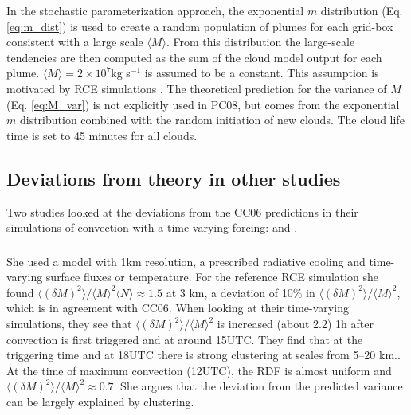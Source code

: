 \documentclass[a4paper, 12pt]{article}
\begin{document}
In the \cite[][PC08]{Plant2008} stochastic parameterization approach, the exponential $m$ distribution (Eq. \ref{eq:m_dist}) is used to create a random population of plumes for each grid-box consistent with a large scale $\langle M \rangle$. From this distribution the large-scale tendencies are then computed as the sum of the cloud model output for each plume. $\langle M \rangle = 2 \times 10^7$kg s$^{-1}$ is assumed to be a constant. This assumption is motivated by RCE simulations \citep[e.g.][]{Cohen2006}. The theoretical prediction for the variance of $M$ (Eq. \ref{eq:M_var}) is not explicitly used in PC08, but comes from the exponential $m$ distribution combined with the random initiation of new clouds. The cloud life time is set to 45 minutes for all clouds. 

\subsection{Deviations from theory in other studies}
Two studies looked at the deviations from the CC06 predictions in their simulations of convection with a time varying forcing: \cite{Davies2008} and \cite{Davoudi2010}.

\subsubsection{\cite{Davies2008}}
She used a model with 1km resolution, a prescribed radiative cooling and time-varying surface fluxes or temperature. For the reference RCE simulation she found $\langle (\delta M)^2 \rangle/\langle M \rangle^2 \langle N \rangle \approx 1.5$ at 3 km, a deviation of 10\% in $\langle (\delta M)^2 \rangle/\langle M \rangle^2$, which is in agreement with CC06. When looking at their time-varying simulations, they see that $\langle (\delta M)^2 \rangle/\langle M \rangle^2$ is increased (about 2.2) 1h after convection is first triggered and at around 15UTC. They find that at the triggering time and at 18UTC there is strong clustering at scales from 5--20 km.. At the time of maximum convection (12UTC), the RDF is almost uniform and $\langle (\delta M)^2 \rangle/\langle M \rangle^2 \approx 0.7$. She argues that the deviation from the predicted variance can be largely explained by clustering. 
\end{document}
